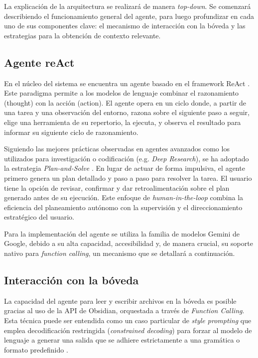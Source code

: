 La explicación de la arquitectura se realizará de manera \textit{top-down}. Se comenzará describiendo el funcionamiento general del agente, para luego profundizar en cada uno de sus componentes clave: el mecanismo de interacción con la bóveda y las estrategias para la obtención de contexto relevante.

\subsection{Agente reAct}
En el núcleo del sistema se encuentra un agente basado en el framework ReAct \parencite{yaoReActSynergizingReasoning2023}. Este paradigma permite a los modelos de lenguaje combinar el razonamiento (thought) con la acción (action). El agente opera en un ciclo donde, a partir de una tarea y una observación del entorno, razona sobre el siguiente paso a seguir, elige una herramienta de su repertorio, la ejecuta, y observa el resultado para informar su siguiente ciclo de razonamiento.

Siguiendo las mejores prácticas observadas en agentes avanzados como los utilizados para investigación o codificación (e.g. \textit{Deep Research}), se ha adoptado la estrategia \textit{Plan-and-Solve} \parencite{wangPlanandSolvePromptingImproving2023}. En lugar de actuar de forma impulsiva, el agente primero genera un plan detallado y paso a paso para resolver la tarea. El usuario tiene la opción de revisar, confirmar y dar retroalimentación sobre el plan generado antes de su ejecución. Este enfoque de \textit{human-in-the-loop} combina la eficiencia del planeamiento autónomo con la supervisión y el direccionamiento estratégico del usuario.

Para la implementación del agente se utiliza la familia de modelos Gemini de Google, debido a su alta capacidad, accesibilidad y, de manera crucial, su soporte nativo para \textit{function calling}, un mecanismo que se detallará a continuación.

\subsection{Interacción con la bóveda}
La capacidad del agente para leer y escribir archivos en la bóveda es posible gracias al uso de la API de Obsidian, orquestada a través de \textit{Function Calling}. Esta técnica puede ser entendida como un caso particular de \textit{style prompting} que emplea decodificación restringida (\textit{constrained decoding}) para forzar al modelo de lenguaje a generar una salida que se adhiere estrictamente a una gramática o formato predefinido \parencite{gengGrammarConstrainedDecodingStructured2024}.

